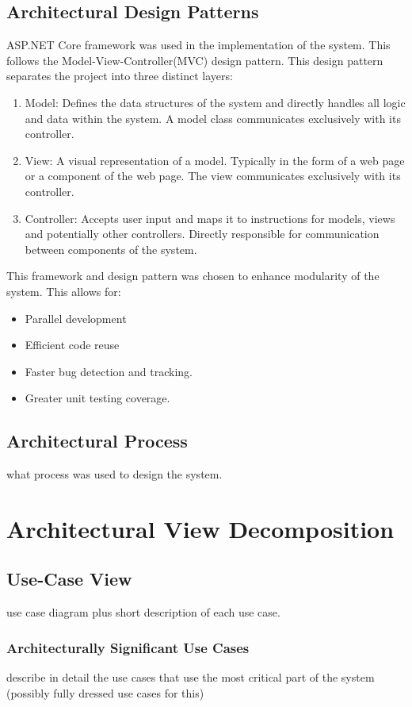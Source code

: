 \documentclass[11pt]{article}
\begin{document}
\subsection{Architectural Design Patterns}
ASP.NET Core framework was used in the implementation of the system. This follows the Model-View-Controller(MVC) design pattern. This design pattern separates the project into three distinct layers:

\begin{enumerate}
	\item Model: Defines the data structures of the system and directly handles all logic and data within the system. A model class communicates exclusively with its controller.
	\item View: A visual representation of a model. Typically in the form of a web page or a component of the web page. The view communicates exclusively with its controller.
	\item Controller: Accepts user input and maps it to instructions for models, views and potentially other controllers. Directly responsible for communication between components of the system.
	
	  
\end{enumerate} 

This framework and design pattern was chosen to enhance modularity of the system. This allows for: 
\begin{itemize}
	\item Parallel development
	\item Efficient code reuse
	\item Faster bug detection and tracking.
	\item Greater unit testing coverage.
	
\end{itemize} 
 
\subsection{Architectural Process}
what process was used to design the system.
\section{Architectural View Decomposition}
\subsection{Use-Case View}
use case diagram plus short description of each use case.
\subsubsection{Architecturally Significant Use Cases}
describe in detail the use cases that use the most critical part of the system (possibly fully dressed use cases for this)
\end{document}
